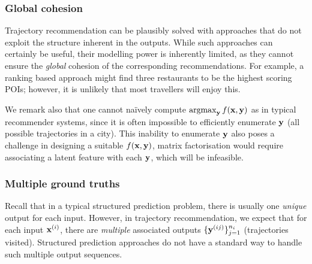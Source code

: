 \subsubsection{Global cohesion}
Trajectory recommendation can be plausibly solved with approaches that do not exploit the structure inherent in the outputs. %
While such approaches can certainly be useful,
their modelling power is inherently limited,
as
they cannot ensure the \emph{global} cohesion of the corresponding recommendations. %
For example, %
a ranking based approach %
might find three restaurants to be the highest scoring POIs;
however, it is unlikely that most travellers will enjoy this. %

We remark also that one cannot na\"{i}vely 
compute $\operatorname*{argmax}_{\mathbf{y}} f(\mathbf{x},\mathbf{y})$
as in typical recommender systems,
since 
it is often impossible to efficiently enumerate $\mathbf{y}$ (\ie all possible trajectories in a city).
This inability to enumerate $\mathbf{y}$ also poses a challenge in designing a suitable $f(\mathbf{x},\mathbf{y})$,
\eg
matrix factorisation
would require associating a latent feature with each $\mathbf{y}$, which will be infeasible.




\subsubsection{Multiple ground truths}
%
Recall that in a typical structured prediction problem,
there is usually one \emph{unique} output for each input.
However, in trajectory recommendation,
we expect that for each input $\mathbf{x}^{({i})}$, %
there are \emph{multiple} associated outputs
$\{ \mathbf{y}^{({ij})} \}_{j=1}^{n_i}$ (\ie trajectories visited).
Structured prediction approaches do not have a standard way to handle such multiple output sequences.


